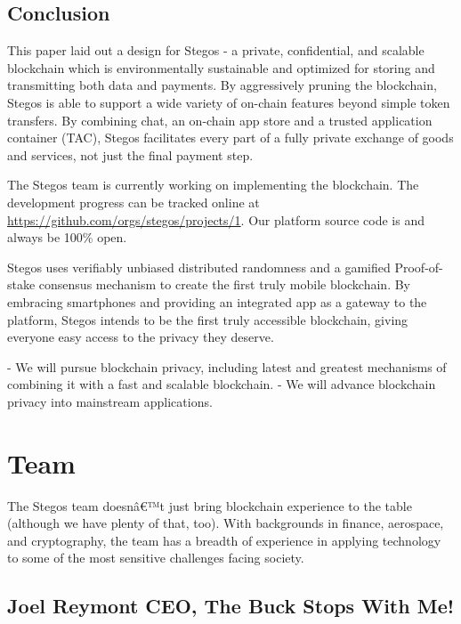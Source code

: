 \documentclass[8pt,fleqn,openany]{book}
\begin{document}
	\section{Conclusion}
	This paper laid out a design for Stegos - a private, confidential, and scalable blockchain which is environmentally sustainable and optimized for storing and transmitting both data and payments. By aggressively pruning the blockchain, Stegos is able to support a wide variety of on-chain features beyond simple token transfers. By combining chat, an on-chain app store and a trusted application container (TAC), Stegos facilitates every part of a fully private exchange of goods and services, not just the final payment step.
	
	The Stegos team is currently working on implementing the blockchain. The development progress can be tracked online at \url{https://github.com/orgs/stegos/projects/1}. Our platform source code is and always be 100\% open.
	
	Stegos uses verifiably unbiased distributed randomness and a gamified Proof-of-stake consensus mechanism to create the first truly mobile blockchain. By embracing smartphones and providing an integrated app as a gateway to the platform, Stegos intends to be the first truly accessible blockchain, giving everyone easy access to the privacy they deserve.     
	
	- We will pursue blockchain privacy, including latest and greatest mechanisms of combining it with a fast and scalable blockchain.
	- We will advance blockchain privacy into mainstream applications.
	
	\chapter{Team}\label{app:team}
	
	The Stegos team doesnâ€™t just bring blockchain experience to the table (although we have plenty of that, too). With backgrounds in finance, aerospace, and cryptography, the team has a breadth of experience in applying technology to some of the most sensitive challenges facing society.
	
	\section{Joel Reymont CEO, The Buck Stops With Me!}
	
\end{document}
